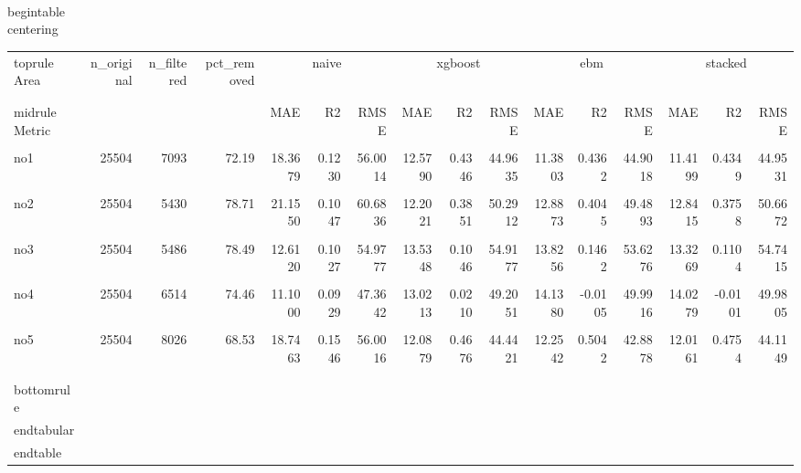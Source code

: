 \begin{landscape}

\\begin{table}
\\centering
\caption{Detailed Metrics Up Test}
\label{tab:metrics_up_test}
\begin{tabular}{|l|rrr|rrr|rrr|rrr|rrr|}
\\toprule
Area & n_original & n_filtered & pct_removed & \multicolumn{3}{c|}{naive} & \multicolumn{3}{c|}{xgboost} & \multicolumn{3}{c|}{ebm} & \multicolumn{3}{c|}{stacked} \\\\
\\midrule
Metric & & & & MAE & R2 & RMSE & MAE & R2 & RMSE & MAE & R2 & RMSE & MAE & R2 & RMSE \\\\
   no1 & 25504 & 7093 & 72.19 & 18.3679 & 0.1230 & 56.0014 & 12.5790 & 0.4346 & 44.9635 & 11.3803 & 0.4362 & 44.9018 & 11.4199 & 0.4349 & 44.9531 \\\\
   no2 & 25504 & 5430 & 78.71 & 21.1550 & 0.1047 & 60.6836 & 12.2021 & 0.3851 & 50.2912 & 12.8873 & 0.4045 & 49.4893 & 12.8415 & 0.3758 & 50.6672 \\\\
   no3 & 25504 & 5486 & 78.49 & 12.6120 & 0.1027 & 54.9777 & 13.5348 & 0.1046 & 54.9177 & 13.8256 & 0.1462 & 53.6276 & 13.3269 & 0.1104 & 54.7415 \\\\
   no4 & 25504 & 6514 & 74.46 & 11.1000 & 0.0929 & 47.3642 & 13.0213 & 0.0210 & 49.2051 & 14.1380 & -0.0105 & 49.9916 & 14.0279 & -0.0101 & 49.9805 \\\\
   no5 & 25504 & 8026 & 68.53 & 18.7463 & 0.1546 & 56.0016 & 12.0879 & 0.4676 & 44.4421 & 12.2542 & 0.5042 & 42.8878 & 12.0161 & 0.4754 & 44.1149 \\\\
\\bottomrule
\\end{tabular}
\\end{table}


\end{tabular}
\end{landscape}
